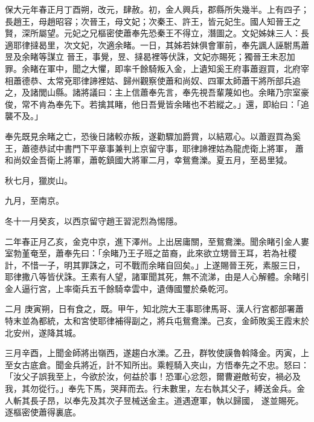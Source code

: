 
\begin{pinyinscope}

 保大元年春正月丁酉朔，改元，肆赦。初，金人興兵，郡縣所失幾半。上有四子；長趙王，母趙昭容；次晉王，母文妃；次秦王、許王，皆元妃生。國人知晉王之賢，深所屬望。元妃之兄樞密使蕭奉先恐秦王不得立，潛圖之。文妃姊妹三人：長適耶律撻曷里，次文妃，次適余睹。一日，其姊若妹俱會軍前，奉先諷人誣駙馬蕭昱及余睹等謀立
 晉王，事覺，昱、撻曷裡等伏誅，文妃亦賜死；獨晉王未忍加罪。余睹在軍中，聞之大懼，即率千餘騎叛入金，上遺知奚王府事蕭遐買，北府宰相蕭德恭、太常兗耶律諦裡姑、歸州觀察使蕭和尚奴、四軍太師蕭干將所部兵追之，及諸閭山縣。諸將議曰：主上信蕭奉先言，奉先視吾輩蔑如也。余睹乃宗室豪俊，常不肯為奉先下。若擒其睹，他日吾覺皆余睹也不若縱之。」還，即紿曰：「追襲不及。」



 奉先既見余睹之亡，恐後日諸較亦叛，遂勸驟加爵賞，以結眾心。以蕭遐買為奚王，蕭德恭試中書門下平章事兼判上京留守事，耶律諦裡姑為龍虎衛上將軍，
 蕭和尚奴金吾衛上將軍，蕭乾鎮國大將軍二月，幸鴛鴦濼。夏五月，至曷里狘。



 秋七月，獵炭山。



 九月，至南京。



 冬十一月癸亥，以西京留守趙王習泥烈為惕隱。



 二年春正月乙亥，金克中京，進下澤州。上出居庸關，至鴛鴦濼。聞余睹引金人婁室勃堇奄至，蕭奉先曰：「余睹乃王子班之苗裔，此來欲立甥晉王耳，若為社稷計，不惜一子，明其罪誅之，可不戰而余睹自回矣。」上遂賜晉王死，素服三日，耶律撒八等皆伏誅。王素有人望，諸軍聞其死，無不流涕，由是人心解體。余睹引金人逼行宮，上率衛兵五千餘騎幸雲中，遺傳國璽於桑乾河。



 二月
 庚寅朔，日有食之，既。甲午，知北院大王事耶律馬哥、漢人行宮都部署蕭特末並為都統，太和宮使耶律補得副之，將兵屯鴛鴦濼。己亥，金師敗奚王霞末於北安州，遂降其城。



 三月辛酉，上聞金師將出嶺西，遂趨白水濼。乙丑，群牧使謨魯斡降金。丙寅，上至女古底倉。聞金兵將近，計不知所出。乘輕騎入夾山，方悟奉先之不忠。怒曰：「汝父子誤我至上，今欲於汝，何益於事！恐軍心忿怨，爾曹避敵茍安，禍必及我，其勿從行。」奉先下馬，哭拜而去。行未數里，左右執其父子，縛送金兵。金人斬其長子昂，以奉先及其次子昱械送金主。道遇遼軍，執以歸國，
 遂並賜死。逐樞密使蕭得裏底。




\end{pinyinscope}
